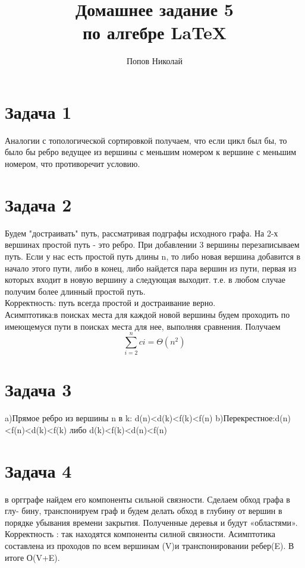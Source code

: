 \documentclass[a4paper,12pt]{article} %
\author{Попов Николай}
\title{Домашнее задание 5\\ по алгебре \LaTeX{}}
\begin{document}


\newpage 

\section*{Задача 1}
Аналогии с топологической сортировкой получаем, что если цикл был бы, то было бы ребро ведущее из вершины с меньшим номером к вершине с меньшим номером, что противоречит условию.\\

\section*{Задача 2}
Будем "достраивать" путь, рассматривая подграфы исходного графа. На 2-х вершинах простой путь - это ребро. При добавлении 3 вершины перезаписываем путь. Если у нас есть простой путь длины n, то либо новая вершина добавится в начало этого пути, либо в конец, либо найдется пара вершин из пути, первая из которых входит в новую вершину а следующая выходит. т.е. в любом случае получим более длинный простой путь.\\
 Корректность: путь всегда простой и достраивание верно.\\
 Асимптотика:в поисках места для каждой новой вершины будем проходить по имеющемуся пути в поисках места для нее, выполняя сравнения. Получаем \[\sum_{i=2}^{n}ci=\Theta(n^2)\]

 
\section*{Задача 3}
a)Прямое ребро из вершины n в k: d(n)<d(k)<f(k)<f(n)
b)Перекрестное:d(n)<f(n)<d(k)<f(k) либо d(k)<f(k)<d(n)<f(n)

\section*{Задача 4}
в оргграфе найдем его компоненты сильной связности. Сделаем обход графа в глу-
бину, транспонируем граф и будем делать обход в глубину от вершин в порядке убывания времени закрытия. Полученные деревья и будут «областями». Корректность : так находятся компоненты силной связности.
Асимптотика составлена из проходов по всем вершинам (V)и транспонировании ребер(E). В итоге О(V+E).\\
\end{document}
